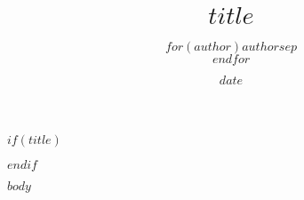 \documentclass[12pt]{article}
\title{$title$}
\author{$for(author)$$author$$sep$\\$endfor$}
\date{$date$}
\begin{document}
$if(title)$
\maketitle
\newpage
$endif$

$body$
\end{document}
